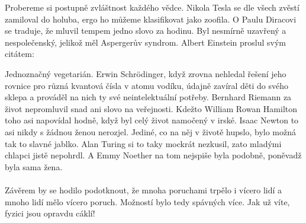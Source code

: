 \documentclass{../../../../style/mkimain}
\begin{document}
\noindent{}
\klein
Probereme si postupně zvláštnost každého vědce. Nikola Tesla se dle všech zvěstí zamiloval do holuba,
ergo ho můžeme klasifikovat jako zoofila. O Paulu Diracovi se traduje, že mluvil tempem jedno slovo za hodinu.
Byl nesmírně uzavřený a nespolečenský, jelikož měl Aspergerův syndrom. Albert Einstein proslul svým citátem:
\begin{center}
\emph{}
\end{center}
Jednoznačný vegetarián. Erwin Schrödinger, když zrovna nehledal řešení jeho rovnice pro různá kvantová čísla v atomu vodíku,
údajně zavíral děti do svého sklepa a prováděl na nich ty své neintelektuální potřeby. Bernhard Riemann za život nepromluvil snad ani slovo na veřejnosti.
Kdežto William Rowan Hamilton toho asi napovídal hodně, když byl celý život namočený v irské. Isaac Newton to asi nikdy s žádnou ženou nerozjel.
Jediné, co na něj v životě hupslo, bylo možná tak to slavné jablko.
Alan Turing si to taky mockrát nezkusil, zato mladými chlapci jistě nepohrdl.
A Emmy Noether na tom nejspiše byla podobně, poněvadž byla sama žena.
\\
\\
Závěrem by se hodilo podotknout, že mnoha poruchami trpělo i vícero lidí a mnoho lidí mělo vícero poruch. Možností bylo tedy spávných více.
Jak už víte, fyzici jsou opravdu cáklí!
\end{document}
